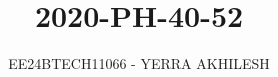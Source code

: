 \documentclass[journal]{IEEEtran}
\begin{document}

\vspace{3cm}

\title{2020-PH-40-52}
\author{EE24BTECH11066 - YERRA AKHILESH
}
{\let\newpage\relax\maketitle}

\renewcommand{\thefigure}{\theenumi}
\renewcommand{\thetable}{\theenumi}
\setlength{\intextsep}{10pt} %


\renewcommand{\thetable}{\theenumi}
\end{document}
